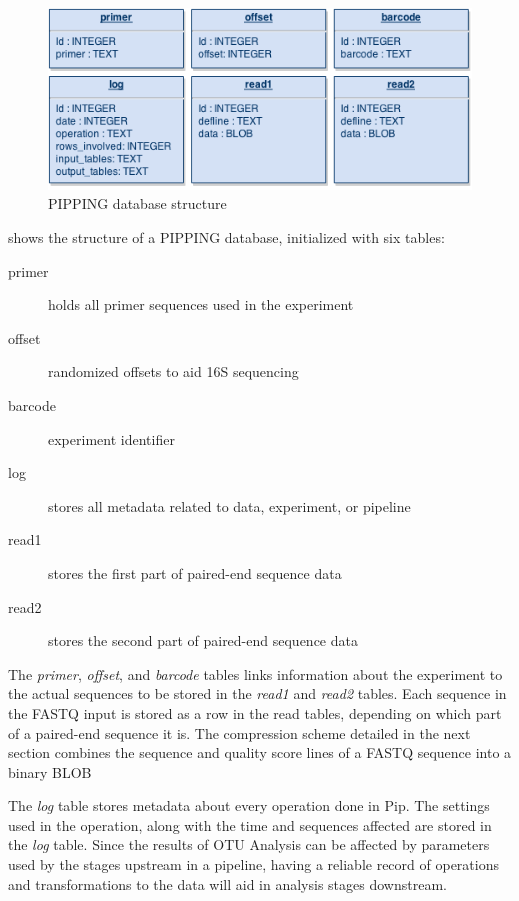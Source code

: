 \documentclass[12pt]{article}
\begin{document}
	\begin{figure}[h!]
		\centering
		\includegraphics[width=\textwidth]{db_structure}
		\caption{PIPPING database structure}
		\label{fig:db_structure}
	\end{figure}
	 shows the structure of a PIPPING database, 
	initialized with six tables:
	
	\begin{description}
		\item[primer] holds all primer sequences used in the experiment
		\item[offset] randomized offsets to aid 16S sequencing
		\item[barcode] experiment identifier
		\item[log] stores all metadata related to data, experiment, or pipeline
		\item[read1] stores the first part of paired-end sequence data
		\item[read2] stores the second part of paired-end sequence data
	\end{description}
	
	The \emph{primer}, \emph{offset}, and \emph{barcode} tables links information 
	about the experiment to the actual sequences to be stored in the \emph{read1} 
	and \emph{read2} tables. Each sequence in the FASTQ input is stored as a row in 
	the read tables, depending on which part of a paired-end sequence it is. The 
	compression scheme detailed in the next section combines 
	the sequence and quality score lines of a FASTQ sequence into a binary BLOB
	
	The \emph{log} table stores metadata about every 
	operation done in Pip. The settings used in the operation, along with the time and sequences affected
	are stored in the \emph{log} table. Since the results of OTU Analysis can be 
	affected by parameters used by the stages upstream in a pipeline, having a 
	reliable record of operations and transformations to the data will aid in 
	analysis stages downstream.
	
\end{document}
